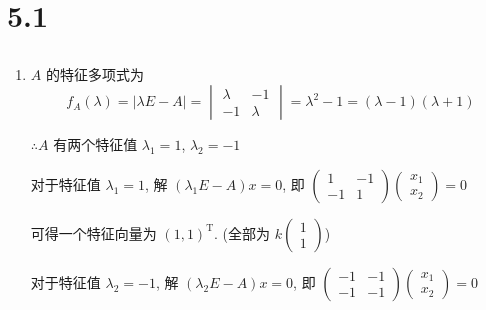 \section{5.1}
 \subsection{} %
     \paragraph{} %
         \begin{enumerate}
             \item %
                   \( A \) 的特征多项式为
                   \[ f_{A}(\lambda) = |\lambda E - A| = \begin{vmatrix}
                           \lambda & -1      \\
                           -1      & \lambda
                       \end{vmatrix} = \lambda^{2} - 1 = (\lambda - 1)(\lambda + 1) \]

                   \( \therefore A \) 有两个特征值 \( \lambda_{1} = 1 \), \( \lambda_{2} = -1 \)

                   对于特征值 \( \lambda_{1} = 1 \), 解 \( (\lambda_{1}E - A)x = 0 \), 即 \( \begin{pmatrix}
                       1  & -1 \\
                       -1 & 1
                   \end{pmatrix}\begin{pmatrix}
                       x_{1} \\
                       x_{2}
                   \end{pmatrix} = 0 \)

                   可得一个特征向量为 \( (1, 1)^{\mathrm{T}} \). (全部为 \( k\begin{pmatrix}
                       1 \\
                       1
                   \end{pmatrix} \))

                   对于特征值 \( \lambda_{2} = -1 \), 解 \( (\lambda_{2}E - A)x = 0 \), 即 \( \begin{pmatrix}
                       -1 & -1 \\
                       -1 & -1
                   \end{pmatrix}\begin{pmatrix}
                       x_{1} \\
                       x_{2}
                   \end{pmatrix} = 0 \)


\end{enumerate}
